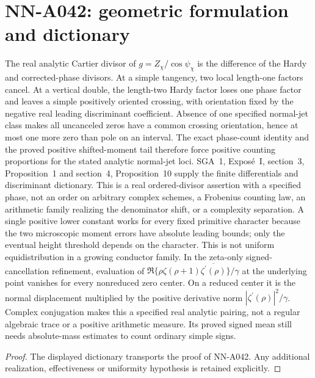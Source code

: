 \section{NN-A042: geometric formulation and dictionary}
\begin{geometricstatement}[NN-A042]
The real analytic Cartier divisor of $g=Z_\chi/\cos\psi_\chi$ is the difference of the Hardy and corrected-phase divisors. At a simple tangency, two local length-one factors cancel. At a vertical double, the length-two Hardy factor loses one phase factor and leaves a simple positively oriented crossing, with orientation fixed by the negative real leading discriminant coefficient. Absence of one specified normal-jet class makes all uncanceled zeros have a common crossing orientation, hence at most one more zero than pole on an interval. The exact phase-count identity and the proved positive shifted-moment tail therefore force positive counting proportions for the stated analytic normal-jet loci. SGA~1, Expos\'e~I, section~3, Proposition~1 and section~4, Proposition~10 supply the finite differentials and discriminant dictionary. This is a real ordered-divisor assertion with a specified phase, not an order on arbitrary complex schemes, a Frobenius counting law, an arithmetic family realizing the denominator shift, or a complexity separation. A single positive lower constant works for every fixed primitive character because the two microscopic moment errors have absolute leading bounds; only the eventual height threshold depends on the character. This is not uniform equidistribution in a growing conductor family. In the zeta-only signed-cancellation refinement, evaluation of $\Re\{\rho\zeta(\rho+1)\overline{\zeta^\prime(\rho)}\}/\gamma$ at the underlying point vanishes for every nonreduced zero center. On a reduced center it is the normal displacement multiplied by the positive derivative norm $|\zeta^\prime(\rho)|^2/\gamma$. Complex conjugation makes this a specified real analytic pairing, not a regular algebraic trace or a positive arithmetic measure. Its proved signed mean still needs absolute-mass estimates to count ordinary simple signs.
\end{geometricstatement}
\begin{proof} The displayed dictionary transports the proof of NN-A042. Any additional realization, effectiveness or uniformity hypothesis is retained explicitly.\end{proof}


